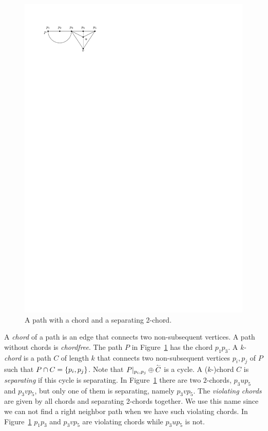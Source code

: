     \begin{figure}[!b]
      \centering
      \includegraphics[scale=1]{unifiedAlgo/img/rightNeighbourwalk/chords.pdf}
      \caption{A path with a chord and a separating 2-chord.}
      \label{fig:right:chord}
    \end{figure}

    A \emph{chord} of a path is an edge that connects two non-subsequent vertices. A path without chords is \emph{chordfree}. The path $P$ in Figure~\ref{fig:right:chord} has the chord $p_1 p_3$.
    A \emph{k-chord} is a path $C$ of length $k$ that connects two non-subsequent vertices $p_i, p_j$ of $P$ such that $P \cap C = \left\lbrace {p_i, p_j} \right\rbrace$.
    Note that $P|_{p_i, p_j} \oplus \accentset{\leftharpoonup}{C}$ is a cycle.
    A ($k$-)chord $C$ is \emph{separating} if this cycle is separating.
    In Figure~\ref{fig:right:chord} there are two $2$-chords, $p_3 u p_5$ and $p_3 v p_5$, but only one of them is separating, namely $p_3 v p_5$.
    The \emph{violating chords} are given by all chords and separating 2-chords together. We use this name since we can not find a right neighbor path when we have such violating chords. In Figure~\ref{fig:right:chord} $p_1p_3$ and $p_3 v p_5$ are violating chords while $p_3 u p_5$ is not.

